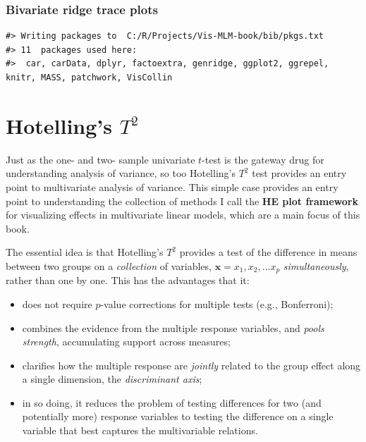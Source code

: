 \documentclass[
  letterpaper,
  10pt,
  krantz2]{krantz}
\providecommand{\tightlist}{%
  \setlength{\itemsep}{0pt}\setlength{\parskip}{0pt}}\usepackage{longtable,booktabs,array}
\begin{document}
{\subsection{Bivariate ridge trace
plots}\label{bivariate-ridge-trace-plots}

\begin{verbatim}
#> Writing packages to  C:/R/Projects/Vis-MLM-book/bib/pkgs.txt
#> 11  packages used here:
#>  car, carData, dplyr, factoextra, genridge, ggplot2, ggrepel, knitr, MASS, patchwork, VisCollin
\end{verbatim}


\chapter{\texorpdfstring{Hotelling's
\(T^2\)}{Hotelling's T\^{}2}}\label{sec-Hotelling}

Just as the one- and two- sample univariate \(t\)-test is the gateway
drug for understanding analysis of variance, so too Hotelling's \(T^2\)
test provides an entry point to multivariate analysis of variance. This
simple case provides an entry point to understanding the collection of
methods I call the \textbf{HE plot framework} for visualizing effects in
multivariate linear models, which are a main focus of this book.

The essential idea is that Hotelling's \(T^2\) provides a test of the
difference in means between two groups on a \emph{collection} of
variables, \(\mathbf{x} = x_1, x_2, \dots x_p\) \emph{simultaneously},
rather than one by one. This has the advantages that it:

\begin{itemize}
\tightlist
\item
  does not require \(p\)-value corrections for multiple tests (e.g.,
  Bonferroni);
\item
  combines the evidence from the multiple response variables, and
  \emph{pools strength}, accumulating support across measures;
\item
  clarifies how the multiple response are \emph{jointly} related to the
  group effect along a single dimension, the \emph{discriminant axis};
\item
  in so doing, it reduces the problem of testing differences for two
  (and potentially more) response variables to testing the difference on
  a single variable that best captures the multivariable relations.
\end{itemize}

}
\end{document}
